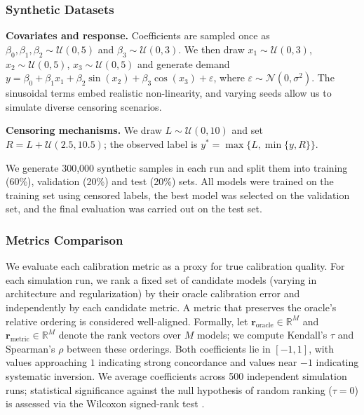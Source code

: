 \documentclass[sigconf]{acmart}
\begin{document}
\subsubsection{Synthetic Datasets}

\textbf{Covariates and response.}
Coefficients are sampled once as $\beta_0,\beta_1,\beta_2\sim\mathcal{U}(0,5)$ and $\beta_3\sim\mathcal{U}(0,3)$.
We then draw $x_1\sim\mathcal{U}(0,3)$, $x_2\sim\mathcal{U}(0,5)$, $x_3\sim\mathcal{U}(0,5)$ and generate demand
$y=\beta_0+\beta_1 x_1+\beta_2\sin(x_2)+\beta_3\cos(x_3)+\varepsilon$, where $\varepsilon\sim\mathcal{N}(0,\sigma^2)$.
The sinusoidal terms embed realistic non-linearity, and varying seeds allow us to simulate diverse censoring scenarios.

\textbf{Censoring mechanisms.}
We draw $L\sim\mathcal{U}(0,10)$ and set $R=L+\mathcal{U}(2.5,10.5)$; the observed label is $y^{*}=\max \{L,\min\{y,R\}\}$.

We generate 300,000 synthetic samples in each run and split them into training (60\%), validation (20\%) and test (20\%) sets. All models were trained on the training set using censored labels, the best model was selected on the validation set, and the final evaluation was carried out on the test set.

\subsubsection{Metrics Comparison}
We evaluate each calibration metric as a proxy for true calibration quality. For each simulation run, we rank a fixed set of candidate models (varying in architecture and regularization) by their oracle calibration error and independently by each candidate metric. A metric that preserves the oracle's relative ordering is considered well-aligned. Formally, let $\mathbf{r}_{\text{oracle}} \in \mathbb{R}^M$ and $\mathbf{r}_{\text{metric}} \in \mathbb{R}^M$ denote the rank vectors over $M$ models; we compute Kendall's $\tau$ \citep{govindarajulu1992rank} and Spearman's $\rho$ \citep{spearman1961proof} between these orderings. Both coefficients lie in $[-1, 1]$, with values approaching $1$ indicating strong concordance and values near $-1$ indicating systematic inversion. We average coefficients across 500 independent simulation runs; statistical significance against the null hypothesis of random ranking ($\tau = 0$) is assessed via the Wilcoxon signed-rank test \citep{wilcoxon1992individual}.
\end{document}
